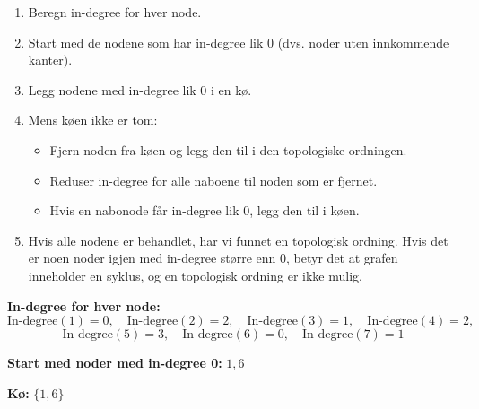 \documentclass[12pt]{article}
\begin{document}
\begin{enumerate}
    \item Beregn in-degree for hver node.
    \item Start med de nodene som har in-degree lik 0 (dvs. noder uten innkommende kanter).
    \item Legg nodene med in-degree lik 0 i en kø.
    \item Mens køen ikke er tom:
    \begin{itemize}
        \item Fjern noden fra køen og legg den til i den topologiske ordningen.
        \item Reduser in-degree for alle naboene til noden som er fjernet.
        \item Hvis en nabonode får in-degree lik 0, legg den til i køen.
    \end{itemize}
    \item Hvis alle nodene er behandlet, har vi funnet en topologisk ordning. Hvis det er noen noder igjen med in-degree større enn 0, betyr det at grafen inneholder en syklus, og en topologisk ordning er ikke mulig.
\end{enumerate}

\textbf{In-degree for hver node:}
\[
    \text{In-degree}(1) = 0, \quad \text{In-degree}(2) = 2, 
    \quad \text{In-degree}(3) = 1, \quad \text{In-degree}(4) = 2, 
\]
\[
    \text{In-degree}(5) = 3,
    \quad \text{In-degree}(6) = 0, \quad \text{In-degree}(7) = 1
\]

\textbf{Start med noder med in-degree 0:} \(1, 6\)

\textbf{Kø:} \( \{ 1, 6 \} \)
\end{document}
